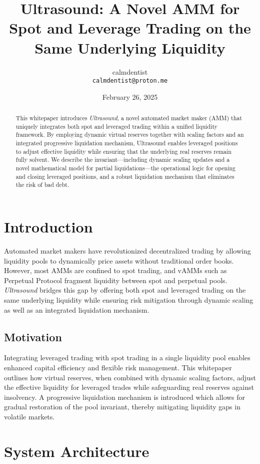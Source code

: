 \documentclass[11pt]{article}
\title{Ultrasound: A Novel AMM for Spot and Leverage Trading on the Same Underlying Liquidity}
\author{calmdentist \\ \texttt{calmdentist@proton.me}}
\date{February 26, 2025}
\begin{document}
\maketitle

\begin{abstract}
This whitepaper introduces \emph{Ultrasound}, a novel automated market maker (AMM) that uniquely integrates both spot and leveraged trading within a unified liquidity framework. By employing dynamic virtual reserves together with scaling factors and an integrated progressive liquidation mechanism, Ultrasound enables leveraged positions to adjust effective liquidity while ensuring that the underlying real reserves remain fully solvent. We describe the invariant—including dynamic scaling updates and a novel mathematical model for partial liquidations—the operational logic for opening and closing leveraged positions, and a robust liquidation mechanism that eliminates the risk of bad debt.
\end{abstract}

\section{Introduction}

Automated market makers have revolutionized decentralized trading by allowing liquidity pools to dynamically price assets without traditional order books. However, most AMMs are confined to spot trading, and vAMMs such as Perpetual Protocol fragment liquidity between spot and perpetual pools. \emph{Ultrasound} bridges this gap by offering both spot and leveraged trading on the same underlying liquidity while ensuring risk mitigation through dynamic scaling as well as an integrated liquidation mechanism.

\subsection{Motivation}
Integrating leveraged trading with spot trading in a single liquidity pool enables enhanced capital efficiency and flexible risk management. This whitepaper outlines how virtual reserves, when combined with dynamic scaling factors, adjust the effective liquidity for leveraged trades while safeguarding real reserves against insolvency. A progressive liquidation mechanism is introduced which allows for gradual restoration of the pool invariant, thereby mitigating liquidity gaps in volatile markets.

\section{System Architecture}
\end{document}
